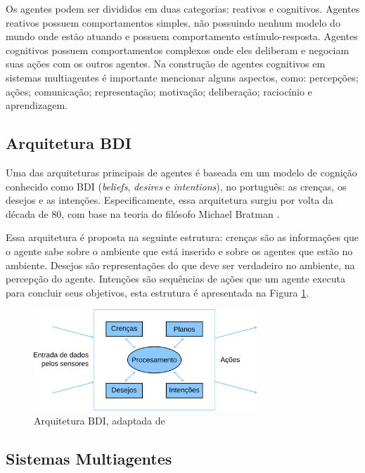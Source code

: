 \documentclass[conference]{IEEEtran}
\begin{document}
        
        Os agentes podem ser divididos em duas categorias: reativos e cognitivos. Agentes reativos possuem comportamentos simples, não possuindo nenhum modelo do mundo onde estão atuando e possuem comportamento estímulo-resposta. Agentes cognitivos possuem comportamentos complexos onde eles deliberam e negociam suas ações com os outros agentes. Na construção de agentes cognitivos em sistemas multiagentes é importante mencionar alguns aspectos, como: percepções; ações; comunicação; representação; motivação; deliberação; raciocínio e aprendizagem.
		\subsection{Arquitetura BDI}
        Uma das arquiteturas principais de agentes é baseada em um modelo de cognição conhecido como BDI (\textit{beliefs}, \textit{desires} e \textit{intentions}), no português: as crenças, os desejos e as intenções. Especificamente, essa arquitetura surgiu por volta da década de 80, com base na teoria do filósofo Michael Bratman \cite{sichman2003raciocinio}.

        Essa arquitetura é proposta na seguinte estrutura: crenças são as informações que o agente sabe sobre o ambiente que está inserido e sobre os agentes que estão no ambiente. Desejos são representações do que deve ser verdadeiro no ambiente, na percepção do agente. Intenções são sequências de ações que um agente executa para concluir seus objetivos, esta estrutura é apresentada na Figura \ref{fig:bdi}.
        
		 \begin{figure}[ht]
            \begin{center}
                \includegraphics[width=3.3in]{BDI.png}
            \end{center}
            \caption{Arquitetura BDI, adaptada de \cite{weiss1999multiagent}}
            \label{fig:bdi}
        \end{figure}
        
		
		\subsection{Sistemas Multiagentes}
\end{document}
